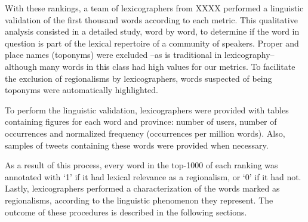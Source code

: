 With these rankings, a team of lexicographers from XXXX performed a linguistic validation of the first thousand words according to each metric. This qualitative analysis consisted in a detailed study, word by word, to determine if the word in question is part of the lexical repertoire of a community of speakers. Proper and place names (toponyms) were excluded --as is traditional in lexicography-- although many words in this class had high values for our metrics. 
To facilitate the exclusion of regionalisms by lexicographers, words suspected of being toponyms were automatically highlighted.

To perform the linguistic validation, lexicographers were provided with tables containing figures for each word and province: number of users, number of occurrences and normalized frequency (occurrences per million words). Also, samples of tweets containing these words were provided when necessary. 

As a result of this process, every word in the top-1000 of each ranking was annotated with `1' if it had lexical relevance as a regionalism, or `0' if it had not. Lastly, lexicographers performed a characterization of the words marked as regionalisms, according to the linguistic phenomenon they represent. The outcome of these procedures is described in the following sections.
